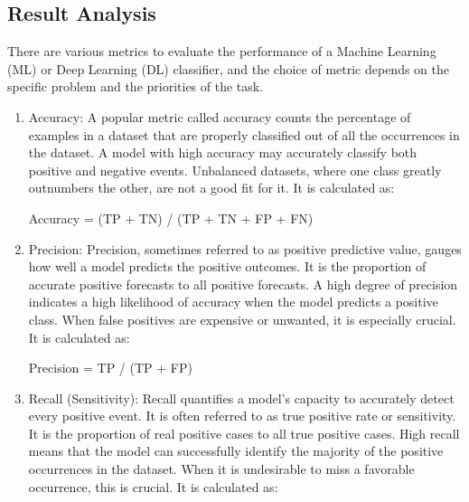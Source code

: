 \documentclass[12pt,a4paper]{report}     %
\begin{document}
\begin{normalsize}
{%
\newpage 
\chapter{}
{\setlength{\baselineskip}{1.1\baselineskip}
\section{Result Analysis }
There are various metrics to evaluate the performance of a Machine Learning (ML) or Deep Learning (DL) classifier, and the choice of metric depends on the specific problem and the priorities of the task. 

\begin{enumerate}

\item Accuracy: A popular metric called accuracy counts the percentage of examples in a dataset that are properly classified out of all the occurrences in the dataset. A model with high accuracy may accurately classify both positive and negative events. Unbalanced datasets, where one class greatly outnumbers the other, are not a good fit for it. It is calculated as:

Accuracy = (TP + TN) / (TP + TN + FP + FN)

\item Precision:  Precision, sometimes referred to as positive predictive value, gauges how well a model predicts the positive outcomes. It is the proportion of accurate positive forecasts to all positive forecasts. A high degree of precision indicates a high likelihood of accuracy when the model predicts a positive class. When false positives are expensive or unwanted, it is especially crucial. It is calculated as:

Precision = TP / (TP + FP)

\item Recall (Sensitivity): Recall quantifies a model's capacity to accurately detect every positive event. It is often referred to as true positive rate or sensitivity. It is the proportion of real positive cases to all true positive cases. High recall means that the model can successfully identify the majority of the positive occurrences in the dataset. When it is undesirable to miss a favorable occurrence, this is crucial. It is calculated as:


\end{enumerate}}}
\end{normalsize}
\end{document}
